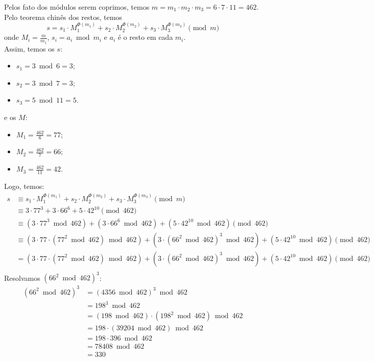 Pelos fato dos módulos serem coprimos, temos $m = m_1 \cdot m_2 \cdot m_3 = 6 \cdot 7 \cdot 11 = 462$. \\
Pelo teorema chinês dos restos, temos 
\begin{displaymath}
	s = s_1 \cdot M_1^{\Phi(m_1)} + s_2 \cdot M_2^{\Phi(m_2)} + s_3 \cdot M_3^{\Phi(m_3)} \pmod{m}
\end{displaymath}
onde $M_i = \frac{m}{m_1}$, $s_i = a_i \bmod{m_i}$ e $a_i$ é o resto em cada $m_i$. \\ 
Assim, temos os $s$:
\begin{itemize}
	\item $s_1 = 3 \bmod{6} = 3$;
	\item $s_2 = 3 \bmod{7} = 3$;
	\item $s_3 = 5 \bmod{11} = 5$.
\end{itemize}
e os $M$:
\begin{itemize}
	\item $M_1 = \frac{462}{6} = 77$;
	\item $M_2 = \frac{462}{7} = 66$;
	\item $M_3 = \frac{462}{11} = 42$.
\end{itemize}
Logo, temos:
\begin{align*}
	s &\equiv s_1 \cdot M_1^{\Phi(m_1)} + s_2 \cdot M_2^{\Phi(m_2)} + s_3 \cdot M_3^{\Phi(m_3)} \pmod{m} \\
	&\equiv 3 \cdot 77^3 + 3 \cdot 66^6 + 5 \cdot 42^{10} \pmod{462} \\
	&\equiv (3 \cdot 77^3 \bmod{462}) + (3 \cdot 66^6 \bmod{462}) + (5 \cdot 42^{10} \bmod{462}) \pmod{462} \\
	&\equiv (3 \cdot 77 \cdot (77^2 \bmod{462}) \bmod{462}) + (3 \cdot (66^2 \bmod{462})^3 \bmod{462}) + (5 \cdot 42^{10} \bmod{462}) \pmod{462} \\
	&= (3 \cdot 77 \cdot (77^2 \bmod{462}) \bmod{462}) + (3 \cdot (66^2 \bmod{462})^3 \bmod{462}) + (5 \cdot 42^{10} \bmod{462}) \pmod{462} \\
\end{align*}
Resolvamos $(66^2 \bmod{462})^3$:
\begin{align*}
	(66^2 \bmod{462})^3 &= (4356 \bmod{462})^3 \bmod{462} \\
	&= 198^3 \bmod{462} \\
	&= (198 \bmod{462}) \cdot (198^2 \bmod{462}) \bmod{462} \\
	&= 198 \cdot (39204 \bmod{462}) \bmod{462} \\
	&= 198 \cdot 396 \bmod{462} \\
	&= 78408 \bmod{462} \\
	&= 330 \\
\end{align*}
